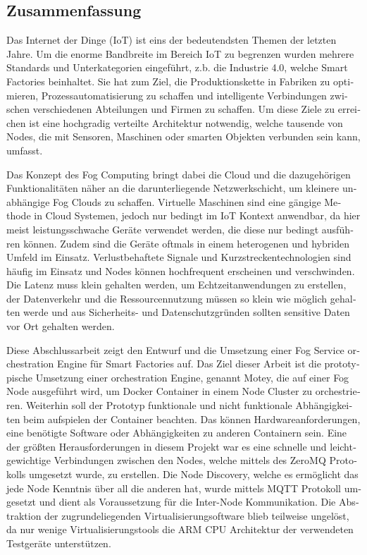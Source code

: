 \begin{otherlanguage}{ngerman}
\chapter*{Zusammenfassung}\label{chapter:zusammenfassung}
Das Internet der Dinge (\acs{IoT}) ist eins der bedeutendsten Themen der letzten Jahre.
Um die enorme Bandbreite im Bereich \acs{IoT} zu begrenzen wurden mehrere Standards und Unterkategorien eingeführt, z.b. die Industrie 4.0, welche Smart Factories beinhaltet.
Sie hat zum Ziel, die Produktionskette in Fabriken zu optimieren, Prozessautomatisierung zu schaffen und intelligente Verbindungen zwischen verschiedenen Abteilungen und Firmen zu schaffen.
Um diese Ziele zu erreichen ist eine hochgradig verteilte Architektur notwendig, welche tausende von Nodes, die mit Sensoren, Maschinen oder smarten Objekten verbunden sein kann, umfasst.

Das Konzept des Fog Computing bringt dabei die Cloud und die dazugehörigen Funktionalitäten näher an die darunterliegende Netzwerkschicht, um kleinere unabhängige Fog Clouds zu schaffen.
Virtuelle Maschinen sind eine gängige Methode in Cloud Systemen, jedoch nur bedingt im \ac{IoT} Kontext anwendbar, da hier meist leistungsschwache Geräte verwendet werden, die diese nur bedingt ausführen können.
Zudem sind die Geräte oftmals in einem heterogenen und hybriden Umfeld im Einsatz.
Verlustbehaftete Signale und Kurzstreckentechnologien sind häufig im Einsatz und Nodes können hochfrequent erscheinen und verschwinden.
Die Latenz muss klein gehalten werden, um Echtzeitanwendungen zu erstellen, der Datenverkehr und die Ressourcennutzung müssen so klein wie möglich gehalten werde und aus Sicherheits- und Datenschutzgründen sollten sensitive Daten vor Ort gehalten werden.

Diese Abschlussarbeit zeigt den Entwurf und die Umsetzung einer Fog Service orchestration Engine für Smart Factories auf.
Das Ziel dieser Arbeit ist die prototypische Umsetzung einer orchestration Engine, genannt Motey, die auf einer Fog Node ausgeführt wird, um Docker Container in einem Node Cluster zu orchestrieren.
Weiterhin soll der Prototyp funktionale und nicht funktionale Abhängigkeiten beim aufspielen der Container beachten.
Das können Hardwareanforderungen, eine benötigte Software oder Abhängigkeiten zu anderen Containern sein.
Eine der größten Herausforderungen in diesem Projekt war es eine schnelle und leichtgewichtige Verbindungen zwischen den Nodes, welche mittels des ZeroMQ Protokolls umgesetzt wurde, zu erstellen.
Die Node Discovery, welche es ermöglicht das jede Node Kenntnis über all die anderen hat, wurde mittels \acs{MQTT} Protokoll umgesetzt und dient als Voraussetzung für die Inter-Node Kommunikation.
Die Abstraktion der zugrundeliegenden Virtualisierungsoftware blieb teilweise ungelöst, da nur wenige Virtualisierungstools die ARM \acs{CPU} Architektur der verwendeten Testgeräte unterstützen.


\end{otherlanguage}
